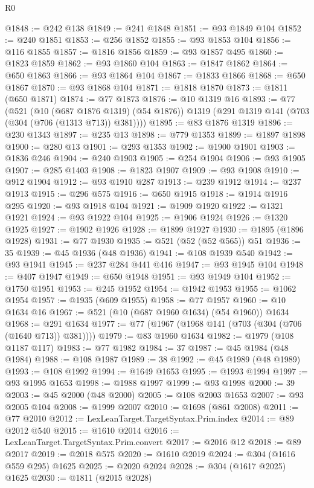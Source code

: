 \begin{lexlean}{R0}
\begin{coremodule}
@1848 := @242 @138
@1849 := @241 @1848
@1851 := @93 @1849 @104
@1852 := @240 @1851
@1853 := @256 @1852
@1855 := @93 @1853 @104
@1856 := @116 @1855
@1857 := @1816 @1856
@1859 := @93 @1857 @495
@1860 := @1823 @1859
@1862 := @93 @1860 @104
@1863 := @1847 @1862
@1864 := @650 @1863
@1866 := @93 @1864 @104
@1867 := @1833 @1866
@1868 := @650 @1867
@1870 := @93 @1868 @104
@1871 := @1818 @1870
@1873 := @1811 (@650 @1871)
@1874 := @77 @1873
@1876 := @10 @1319 @16
@1893 := @77
    (@521
      (@10 (@687 @1876 @1319) (@54 @1876))
      @1319
      (@291 @1319 @141 (@703 (@304 (@706 (@1313 @713)) @381))))
@1895 := @83 @1876 @1319
@1896 := @230 @1343
@1897 := @235 @13
@1898 := @779 @1353
@1899 := @1897 @1898
@1900 := @280 @13
@1901 := @293 @1353
@1902 := @1900 @1901
@1903 := @1836 @246
@1904 := @240 @1903
@1905 := @254 @1904
@1906 := @93 @1905
@1907 := @285 @1403
@1908 := @1823 @1907
@1909 := @93 @1908
@1910 := @912 @1904
@1912 := @93 @1910 @287
@1913 := @239 @1912
@1914 := @237 @1913
@1915 := @296 @575
@1916 := @650 @1915
@1918 := @1914 @1916 @295
@1920 := @93 @1918 @104
@1921 := @1909 @1920
@1922 := @1321 @1921
@1924 := @93 @1922 @104
@1925 := @1906 @1924
@1926 := @1320 @1925
@1927 := @1902 @1926
@1928 := @1899 @1927
@1930 := @1895 (@1896 @1928)
@1931 := @77 @1930
@1935 := @521 (@52 (@52 @565)) @51
@1936 := 35
@1939 := @45 @1936 (@48 @1936)
@1941 := @108 @1939 @540
@1942 := @93 @1941
@1945 := @237 @284 @441 @416
@1947 := @93 @1945 @104
@1948 := @407 @1947
@1949 := @650 @1948
@1951 := @93 @1949 @104
@1952 := @1750 @1951
@1953 := @245 @1952
@1954 := @1942 @1953
@1955 := @1062 @1954
@1957 := @1935 (@609 @1955)
@1958 := @77 @1957
@1960 := @10 @1634 @16
@1967 := @521 (@10 (@687 @1960 @1634) (@54 @1960)) @1634
@1968 := @291 @1634
@1977 := @77 (@1967 (@1968 @141 (@703 (@304 (@706 (@1640 @713)) @381))))
@1979 := @83 @1960 @1634
@1982 := @1979 (@108 @1187 @117)
@1983 := @77 @1982
@1984 := 37
@1987 := @45 @1984 (@48 @1984)
@1988 := @108 @1987
@1989 := 38
@1992 := @45 @1989 (@48 @1989)
@1993 := @108 @1992
@1994 := @1649 @1653
@1995 := @1993 @1994
@1997 := @93 @1995 @1653
@1998 := @1988 @1997
@1999 := @93 @1998
@2000 := 39
@2003 := @45 @2000 (@48 @2000)
@2005 := @108 @2003 @1653
@2007 := @93 @2005 @104
@2008 := @1999 @2007
@2010 := @1698 (@861 @2008)
@2011 := @77 @2010
@2012 := LexLeanTarget.TargetSyntax.Prim.index
@2014 := @89 @2012 @540
@2015 := @1610 @2014
@2016 := LexLeanTarget.TargetSyntax.Prim.convert
@2017 := @2016 @12
@2018 := @89 @2017
@2019 := @2018 @575
@2020 := @1610 @2019
@2024 := @304 (@1616 @559 @295) @1625
@2025 := @2020 @2024
@2028 := @304 (@1617 @2025) @1625
@2030 := @1811 (@2015 @2028)

\end{coremodule}
\end{lexlean}
